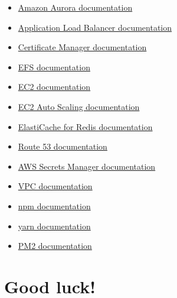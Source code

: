 \documentclass{article}
\begin{document}
\begin{itemize}
  \item \href{https://docs.aws.amazon.com/AmazonRDS/latest/AuroraUserGuide/CHAP_AuroraOverview.html}{Amazon Aurora documentation}
  \item \href{https://docs.aws.amazon.com/elasticloadbalancing/latest/application/introduction.html}{Application Load Balancer documentation}
  \item \href{https://docs.aws.amazon.com/acm/latest/userguide/acm-overview.html}{Certificate Manager documentation}
  \item \href{https://docs.aws.amazon.com/efs/latest/ug/whatisefs.html}{EFS documentation}
  \item \href{https://docs.aws.amazon.com/AWSEC2/latest/UserGuide/concepts.html}{EC2 documentation}
  \item \href{https://docs.aws.amazon.com/autoscaling/ec2/userguide/what-is-amazon-ec2-auto-scaling.html}{EC2 Auto Scaling documentation}
  \item \href{https://docs.aws.amazon.com/AmazonElastiCache/latest/red-ug/WhatIs.html}{ElastiCache for Redis documentation}
  \item \href{https://docs.aws.amazon.com/Route53/latest/DeveloperGuide/Welcome.html}{Route 53 documentation}
  \item \href{https://docs.aws.amazon.com/secretsmanager/latest/userguide/intro.html}{AWS Secrets Manager documentation}
  \item \href{https://docs.aws.amazon.com/vpc/latest/userguide/what-is-amazon-vpc.html}{VPC documentation}
  \item \href{https://docs.npmjs.com/cli/v8/commands/}{npm documentation}
  \item \href{https://classic.yarnpkg.com/en/docs}{yarn documentation}
  \item \href{https://pm2.keymetrics.io/docs/usage/process-management/}{PM2 documentation}
\end{itemize}

\section*{Good luck!}
\end{document}
